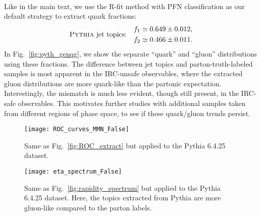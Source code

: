\documentclass[aps,prd,twocolumn,preprintnumbers,nofootinbib,longbibliography,floatfix]{revtex4-1}
\DeclareRobustCommand{\Fig}[1]{Fig.~\ref{#1}}
\newcommand{\Pythia}{{\sc Pythia}\xspace}
\begin{document}
\begin{figure*}[t]
	\centering
	\\
	\caption{
	Same as \Fig{fig:simqg} but applied to the \Pythia 6.4.25 dataset.
	Compared to the truth-parton-labeled samples, the extracted ``gluon'' distribution (green) is more quark like.
	}
	\label{fig:pyth_genqg}
\end{figure*}


Like in the main text, we use the R-fit method with PFN classification as our default strategy to extract quark fractions:
%
\begin{equation}
	\label{eq:quark_fractions_PFN_pythia}
	\text{\Pythia jet topics:} \quad
	\begin{aligned}
		f_1 &\simeq 0.649 \pm 0.012, \\
		f_2 &\simeq 0.466\pm 0.011.
	\end{aligned}
\end{equation}
%
In \Fig{fig:pyth_genqg}, we show the separate ``quark'' and ``gluon'' distributions using these fractions.
%
The difference between jet topics and parton-truth-labeled samples is most apparent in the IRC-unsafe observables, where the extracted gluon distributions are more quark-like than the partonic expectation.
%
Interestingly, the mismatch is much less evident, though still present, in the IRC-safe observables.
%
This motivates further studies with additional samples taken from different regions of phase space, to see if these quark/gluon trends persist.


\begin{figure}[t]
\centering
\texttt{[image: ROC\_curves\_MMN\_False]}
\caption{
%
Same as \Fig{fig:ROC_extract} but applied to the \Pythia 6.4.25 dataset. 
}
\label{fig:ROC_extract_pythia}
\end{figure}

\begin{figure}[t]
	\texttt{[image: eta\_spectrum\_False]}
	\caption{
		Same as \Fig{fig:rapidity_spectrum} but applied to the \Pythia 6.4.25 dataset. 
		Here, the topics extracted from \Pythia are more gluon-like compared to the parton labels.
	}
	\label{fig:rapidity_spectrum_pythia}
\end{figure}
\end{document}
